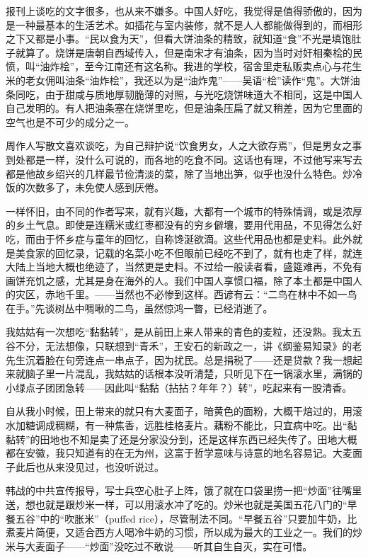\par 报刊上谈吃的文字很多，也从来不嫌多。中国人好吃，我觉得是值得骄傲的，因为是一种最基本的生活艺术。如插花与室内装修，就不是人人都能做得到的，而相形之下又都是小事。“民以食为天”，但看大饼油条的精致，就知道“食”不光是填饱肚子就算了。烧饼是唐朝自西域传入，但是南宋才有油条，因为当时对奸相秦桧的民愤，叫“油炸桧”，至今江南还有这名称。我进的学校，宿舍里走私贩卖点心与花生米的老女佣叫油条“油炸桧”，我还以为是“油炸鬼”——吴语“桧”读作“鬼”。大饼油条同吃，由于甜咸与质地厚韧脆薄的对照，与光吃烧饼味道大不相同，这是中国人自己发明的。有人把油条塞在烧饼里吃，但是油条压扁了就又稍差，因为它里面的空气也是不可少的成分之一。
\par 周作人写散文喜欢谈吃，为自己辩护说“饮食男女，人之大欲存焉”，但是男女之事到处都是一样，没什么可说的，而各地的吃食不同。这话也有理，不过他写来写去都是他故乡绍兴的几样最节俭清淡的菜，除了当地出笋，似乎也没什么特色。炒冷饭的次数多了，未免使人感到厌倦。
\par 一样怀旧，由不同的作者写来，就有兴趣，大都有一个城市的特殊情调，或是浓厚的乡土气息。即使是连糯米或红枣都没有的穷乡僻壤，要用代用品，不见得怎么好吃，而由于怀乡症与童年的回忆，自称馋涎欲滴。这些代用品也都是史料。此外就是美食家的回忆录，记载的名菜小吃不但眼前已经吃不到了，就有也走了样，就连大陆上当地大概也绝迹了，当然更是史料。不过给一般读者看，盛筵难再，不免有画饼充饥之感，尤其是身在海外的人。我们中国人享惯口福，除了本土都是中国人的灾区，赤地千里。——当然也不必惨到这样。西谚有云：“二鸟在林中不如一鸟在手。”先谈树丛中啁啾的二鸟，虽然惊鸿一瞥，已经消逝了。
\par 我姑姑有一次想吃“黏黏转”，是从前田上来人带来的青色的麦粒，还没熟。我太五谷不分，无法想像，只联想到“青禾”，王安石的新政之一，讲《纲鉴易知录》的老先生沉着脸在句旁连点一串点子，因为扰民。总是捐税了——还是贷款？我一想起来就脑子里一片混乱，我姑姑的话根本没听清楚，只听见下在一锅滚水里，满锅的小绿点子团团急转——因此叫“黏黏（拈拈？年年？）转”，吃起来有一股清香。
\par 自从我小时候，田上带来的就只有大麦面子，暗黄色的面粉，大概干焙过的，用滚水加糖调成稠糊，有一种焦香，远胜桂格麦片。藕粉不能比，只宜病中吃。出“黏黏转”的田地也不知是卖了还是分家没分到，还是这样东西已经失传了。田地大概都在安徽，我只知道有的在无为州，这富于哲学意味与诗意的地名容易记。大麦面子此后也从来没见过，也没听说过。
\par 韩战的中共宣传报导，写士兵空心肚子上阵，饿了就在口袋里捞一把“炒面”往嘴里送，想也就是跟炒米一样，可以用滚水冲了吃的。炒米也就是美国五花八门的“早餐五谷”中的“吹胀米”（puffed rice），尽管制法不同。“早餐五谷”只要加牛奶，比煮麦片简便，又适合西方人喝冷牛奶的习惯，所以成为最大的工业之一。我们的炒米与大麦面子——“炒面”没吃过不敢说——听其自生自灭，实在可惜。
